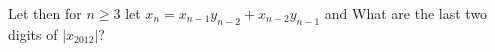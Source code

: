 Let  then for $n\geq 3$ let $x_n=x_{n-1}y_{n-2}+x_{n-2}y_{n-1}$ and   What are the last two digits of $|x_{2012}|?$